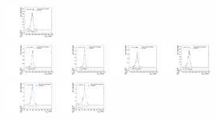 \begin{figure}[htpb]
  \includegraphics[width=0.2\textwidth]{fig/analysisAppendix/templateVsReco_VBFRadToWW2000_r0_MVV_mu_LP_nobb_HDy_linear.pdf}\\
  \includegraphics[width=0.2\textwidth]{fig/analysisAppendix/templateVsReco_VBFRadToWW2000_r0_MVV_mu_HP_vbf_LDy_linear.pdf}
  \includegraphics[width=0.2\textwidth]{fig/analysisAppendix/templateVsReco_VBFRadToWW2000_r0_MVV_mu_LP_vbf_LDy_linear.pdf}
  \includegraphics[width=0.2\textwidth]{fig/analysisAppendix/templateVsReco_VBFRadToWW2000_r0_MVV_mu_HP_vbf_HDy_linear.pdf}
  \includegraphics[width=0.2\textwidth]{fig/analysisAppendix/templateVsReco_VBFRadToWW2000_r0_MVV_mu_LP_vbf_HDy_linear.pdf}\\
  \includegraphics[width=0.2\textwidth]{fig/analysisAppendix/templateVsReco_VBFRadToWW2000_r0_MJ_mu_HP_bb_LDy.pdf}
  \includegraphics[width=0.2\textwidth]{fig/analysisAppendix/templateVsReco_VBFRadToWW2000_r0_MJ_mu_LP_bb_LDy.pdf}

\end{figure}

